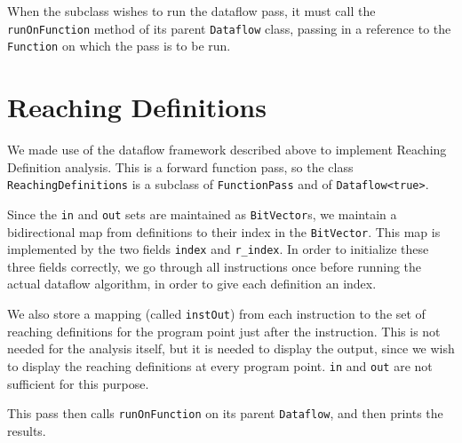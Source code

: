 \documentclass[12pt]{article}
\begin{document}
When the subclass wishes to run the dataflow pass, it must call the \verb|runOnFunction| method of its parent \verb|Dataflow| class, passing in a reference to the \verb|Function| on which the pass is to be run.

\section{Reaching Definitions}
We made use of the dataflow framework described above to implement Reaching Definition analysis. This is a forward function pass, so the class \verb|ReachingDefinitions| is a subclass of \verb|FunctionPass| and of \verb|Dataflow<true>|.

Since the \verb|in| and \verb|out| sets are maintained as \verb|BitVector|s, we maintain a bidirectional map from definitions to their index in the \verb|BitVector|. This map is implemented by the two fields \verb|index| and \verb|r_index|. In order to initialize these three fields correctly, we go through all instructions once before running the actual dataflow algorithm, in order to give each definition an index.

We also store a mapping (called \verb|instOut|) from each instruction to the set of reaching definitions for the program point just after the instruction. This is not needed for the analysis itself, but it is needed to display the output, since we wish to display the reaching definitions at every program point. \verb|in| and \verb|out| are not sufficient for this purpose.

This pass then calls \verb|runOnFunction| on its parent \verb|Dataflow|, and then prints the results.
\end{document}
